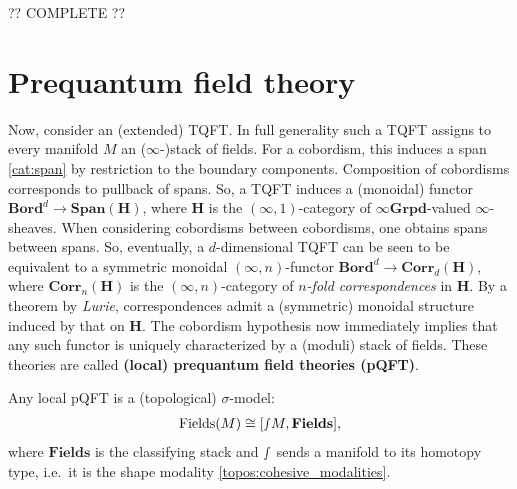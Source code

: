     ?? COMPLETE ??

\section{Prequantum field theory}

    Now, consider an (extended) TQFT. In full generality such a TQFT assigns to every manifold $M$ an ($\infty$-)stack of fields. For a cobordism, this induces a span \ref{cat:span} by restriction to the boundary components. Composition of cobordisms corresponds to pullback of spans. So, a TQFT induces a (monoidal) functor $\mathbf{Bord}^d\rightarrow\mathbf{Span}(\mathbf{H})$, where $\mathbf{H}$ is the $(\infty,1)$-category of $\infty\mathbf{Grpd}$-valued $\infty$-sheaves. When considering cobordisms between cobordisms, one obtains spans between spans. So, eventually, a $d$-dimensional TQFT can be seen to be equivalent to a symmetric monoidal $(\infty,n)$-functor $\mathbf{Bord}^d\rightarrow\mathbf{Corr}_d(\mathbf{H})$, where $\mathbf{Corr}_n(\mathbf{H})$ is the $(\infty,n)$-category of \textit{$n$-fold correspondences} in $\mathbf{H}$. By a theorem by \textit{Lurie}, correspondences admit a (symmetric) monoidal structure induced by that on $\mathbf{H}$. The cobordism hypothesis now immediately implies that any such functor is uniquely characterized by a (moduli) stack of fields. These theories are called \textbf{(local) prequantum field theories (pQFT)}.

    \begin{property}
        Any local pQFT is a (topological) $\sigma$-model:
        \begin{gather}
            \mathrm{Fields}(M)\cong[\smallint\!M,\mathbf{Fields}],
        \end{gather}
        where $\mathbf{Fields}$ is the classifying stack and $\smallint$ sends a manifold to its homotopy type, i.e.~it is the shape modality \ref{topos:cohesive_modalities}.
    \end{property}

